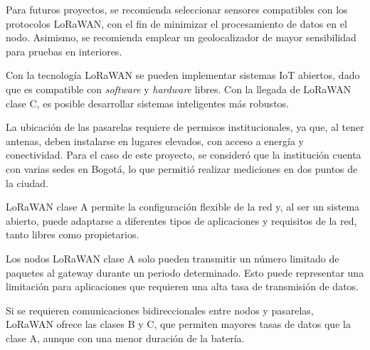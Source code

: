 Para futuros proyectos, se recomienda seleccionar sensores compatibles con los protocolos LoRaWAN, con el fin de minimizar el procesamiento de datos en el nodo. Asimismo, se recomienda emplear un geolocalizador de mayor sensibilidad para pruebas en interiores.

Con la tecnología LoRaWAN se pueden implementar sistemas IoT abiertos, dado que es compatible con \emph{software} y \emph{hardware} libres. Con la llegada de LoRaWAN clase C, es posible desarrollar sistemas inteligentes más robustos.

La ubicación de las pasarelas requiere de permisos institucionales, ya que, al tener antenas, deben instalarse en lugares elevados, con acceso a energía y conectividad. Para el caso de este proyecto, se consideró que la institución cuenta con varias sedes en Bogotá, lo que permitió realizar mediciones en dos puntos de la ciudad.

LoRaWAN clase A permite la configuración flexible de la red y, al ser un sistema abierto, puede adaptarse a diferentes tipos de aplicaciones y requisitos de la red, tanto libres como propietarios.

Los nodos LoRaWAN clase A solo pueden transmitir un número limitado de paquetes al gateway durante un periodo determinado. Esto puede representar una limitación para aplicaciones que requieren una alta tasa de transmisión de datos.

Si se requieren comunicaciones bidireccionales entre nodos y pasarelas, LoRaWAN ofrece las clases B y C, que permiten mayores tasas de datos que la clase A, aunque con una menor duración de la batería.
